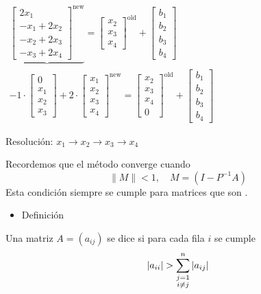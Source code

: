 \begin{itemize}
$\begin{array}{l}
	\underbrace{\begin{bmatrix}
			2x_1\\
			-x_1+2x_2\\
			-x_2+2x_3\\
			-x_3+2x_4
	\end{bmatrix}^{\mathrm{new}}}=\begin{bmatrix}
	x_2\\
	x_3\\
	x_4
\end{bmatrix}^{\mathrm{old}}+\begin{bmatrix}
b_1\\
b_2\\
b_3\\
b_4
\end{bmatrix}\\
-1\cdot\begin{bmatrix}
	0\\
	x_1\\
	x_2\\
	x_3
\end{bmatrix}+2\cdot\begin{bmatrix}
x_1\\
x_2\\
x_3\\
x_4
\end{bmatrix}^{\mathrm{new}}=\begin{bmatrix}
x_2\\
x_3\\
x_4\\
0
\end{bmatrix}^{\mathrm{old}}+\begin{bmatrix}
b_1\\
b_2\\
b_3\\
b_4
\end{bmatrix}
\end{array}$

Resolución: $x_1\longrightarrow x_2\longrightarrow x_3\longrightarrow x_4$
\end{itemize}
Recordemos que el método converge cuando \[ \|M\|<1,\quad M=(I-P^{-1}A) \]Esta condición siempre se cumple para matrices que son .
\begin{itemize}[label=\color{red}\textbullet, leftmargin=*]
	\item \color{lightblue}Definición
\end{itemize}
Una matriz $A=(a_{ij})$ se dice  si para cada fila $i$ se cumple \[|a_{ii}|>\sum_{\begin{subarray}{c}
		j=1\\
		i\neq j
\end{subarray}}^{n}|a_{ij}|\]
\Ej

